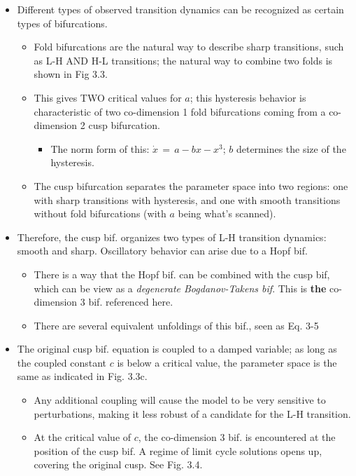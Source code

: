 \documentclass[a4paper]{article}
\begin{document}
\begin{itemize}
\item
  Different types of observed transition dynamics can be recognized as
  certain types of bifurcations.

  \begin{itemize}
  \item
    Fold bifurcations are the natural way to describe sharp transitions,
    such as L-H AND H-L transitions; the natural way to combine two
    folds is shown in Fig 3.3.
  \item
    This gives TWO critical values for $a$; this hysteresis behavior is
    characteristic of two co-dimension 1 fold bifurcations coming from a
    co-dimension 2 cusp bifurcation.

    \begin{itemize}
    \itemsep1pt\parskip0pt
    \item
      The norm form of this: $\dot{x} \,=\, a - bx - x^3$; $b$
      determines the size of the hysteresis.
    \end{itemize}
  \item
    The cusp bifurcation separates the parameter space into two regions:
    one with sharp transitions with hysteresis, and one with smooth
    transitions without fold bifurcations (with $a$ being what's
    scanned).
  \end{itemize}
\item
  Therefore, the cusp bif. organizes two types of L-H transition
  dynamics: smooth and sharp. Oscillatory behavior can arise due to a
  Hopf bif.

  \begin{itemize}
  \item
    There is a way that the Hopf bif. can be combined with the cusp bif,
    which can be view as a \emph{degenerate Bogdanov-Takens bif}. This
    is \textbf{the} co-dimension 3 bif. referenced here.
  \item
    There are several equivalent unfoldings of this bif., seen as Eq.
    3-5
  \end{itemize}
\item
  The original cusp bif. equation is coupled to a damped variable; as
  long as the coupled constant $c$ is below a critical value, the
  parameter space is the same as indicated in Fig. 3.3c.

  \begin{itemize}
  \item
    Any additional coupling will cause the model to be very sensitive to
    perturbations, making it less robust of a candidate for the L-H
    transition.
  \item
    At the critical value of $c$, the co-dimension 3 bif. is encountered
    at the position of the cusp bif. A regime of limit cycle solutions
    opens up, covering the original cusp. See Fig. 3.4.


\end{itemize}
\end{itemize}
\end{document}
